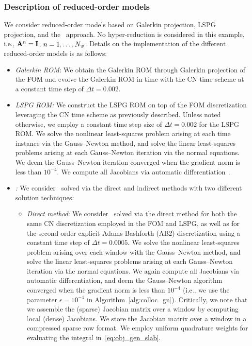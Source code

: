 \subsubsection{Description of reduced-order models}
We consider reduced-order models based on Galerkin projection, LSPG
projection, and the \methodAcronym\ approach. No hyper-reduction is considered 
in this example, i.e., $\mathbf{A}^{n} = \mathbf{I}$, $n=1,\ldots,N_w$. Details on the implementation of the 
different reduced-order models is as follows:
\begin{itemize}
\item \textit{Galerkin ROM}: We obtain the Galerkin ROM through Galerkin projection of the FOM and evolve the Galerkin ROM in time with the CN time scheme at a constant time step of $ \Delta t = 0.002$.

\item \textit{LSPG ROM:} We construct the LSPG ROM on top of the FOM
	discretization leveraging the CN time scheme as previously described. Unless
		noted otherwise, we employ a constant time step size of $\Delta t =
		0.002$ for the LSPG ROM. We solve the nonlinear least-squares problem arising at each time instance
		via the Gauss--Newton method, and solve the linear least-squares problems
		arising at each Gauss--Newton iteration via the normal
		equations. We deem the Gauss--Newton iteration converged when the gradient norm is less than $10^{-4}$.  We compute all Jacobians via automatic
		differentiation~\cite{adolc}. 
\item \textit{\methodAcronymROM:} We consider \methodAcronymROMs\ solved via the
	direct and indirect methods with two different solution techniques:
\begin{itemize}
	\item \textit{Direct method}: We consider \methodAcronymROMs\ solved via the direct method for both the same CN discretization employed in the FOM and LSPG, as well as for the second-order explicit Adams Bashforth (AB2) discretization using a constant time step of $\Delta t = 0.0005$. We solve the nonlinear least-squares problem 
arising over each window with the Gauss--Newton method, and solve the linear
		least-squares problems arising at each Gauss--Newton iteration 
		via the normal equations. We again compute all Jacobians via automatic
		differentiation, and deem the Gauss--Newton algorithm converged when
		the gradient norm is less than $10^{-4}$ (i.e., we use the parameter $\epsilon = 10^{-4}$ in Algorithm~\ref{alg:colloc_gn}). Critically, we note that we assemble the (sparse) Jacobian 
matrix over a window by computing local (dense) Jacobians. We store the Jacobian matrix over a window in a compressed sparse row format. We employ uniform quadrature weights for evaluating the integral in~\eqref{eq:obj_gen_slab}. 


\end{itemize}
\end{itemize}
